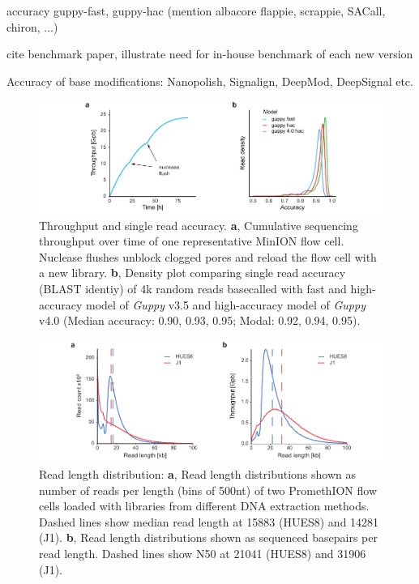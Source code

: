 accuracy guppy-fast, guppy-hac (mention albacore flappie, scrappie, SACall, chiron, ...)

cite benchmark paper, illustrate need for in-house benchmark of each new version

Accuracy of base modifications: Nanopolish, Signalign, DeepMod, DeepSignal etc.


\begin{figure}[h]
    \centering
    \includegraphics[width=1.0\textwidth]{figures/state_of_art/throughput.pdf}
    \captionsetup{format=plain}
    \caption[Throughput and accuracy]{Throughput and single read accuracy. \textbf{a}, Cumulative sequencing throughput over time of one representative MinION flow cell. Nuclease flushes unblock clogged pores and reload the flow cell with a new library. \textbf{b}, Density plot comparing single read accuracy (BLAST identiy) of 4k random reads basecalled with fast and high-accuracy model of \textit{Guppy} v3.5 and high-accuracy model of \textit{Guppy} v4.0 (Median accuracy: 0.90, 0.93, 0.95; Modal: 0.92, 0.94, 0.95).}
    \label{fig:state_of_art:throughput}
\end{figure}

\begin{figure}[h]
    \centering
    \includegraphics[width=1.0\textwidth]{figures/state_of_art/read_length.pdf}
    \captionsetup{format=plain}
    \caption[Read length median and N50]{Read length distribution: \textbf{a}, Read length distributions shown as number of reads per length (bins of 500nt) of two PromethION flow cells loaded with libraries from different DNA extraction methods. Dashed lines show median read length at 15883 (HUES8) and 14281 (J1). \textbf{b}, Read length distributions shown as sequenced basepairs per read length. Dashed lines show N50 at 21041 (HUES8) and 31906 (J1).}
    \label{fig:state_of_art:read_length}
\end{figure}

